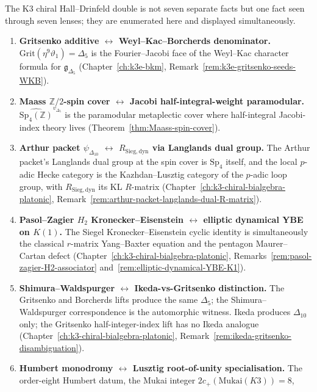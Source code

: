 \begin{remark}
\label{rem:qca-seven-lenses}
The K3 chiral Hall--Drinfeld double is not seven separate facts but one
fact seen through seven lenses; they are enumerated here and displayed
simultaneously.
\begin{enumerate}[label=\textup{(L\arabic*)}]
\item \textbf{Gritsenko additive $\leftrightarrow$ Weyl--Kac--Borcherds denominator.}
 $\mathrm{Grit}(\eta^9\vartheta_1) = \Delta_5$ is the Fourier--Jacobi face of the
 Weyl--Kac character formula for $\mathfrak{g}_{\Delta_5}$
 (Chapter~\ref{ch:k3e-bkm}, Remark~\ref{rem:k3e-gritsenko-seeds-WKB}).
\item \textbf{Maass $\mathbb{Z}/2$-spin cover $\leftrightarrow$ Jacobi half-integral-weight paramodular.}
 $\widehat{\mathrm{Sp}_4(\mathbb{Z})}^{v_{\Delta_5}}$ is the paramodular metaplectic
 cover where half-integral Jacobi-index theory lives
 (Theorem~\ref{thm:Maass-spin-cover}).
\item \textbf{Arthur packet $\psi_{\Delta_{10}}$ $\leftrightarrow$ $R_{\mathrm{Sieg,dyn}}$ via Langlands dual group.}
 The Arthur packet's Langlands dual group at the spin cover is $\mathrm{Sp}_4$ itself,
 and the local $p$-adic Hecke category is the Kazhdan--Lusztig category of the
 $p$-adic loop group, with $R_{\mathrm{Sieg,dyn}}$ its KL $R$-matrix
 (Chapter~\ref{ch:k3-chiral-bialgebra-platonic},
 Remark~\ref{rem:arthur-packet-langlands-dual-R-matrix}).
\item \textbf{Pasol--Zagier $H_2$ Kronecker--Eisenstein $\leftrightarrow$ elliptic dynamical YBE on $K(1)$.}
 The Siegel Kronecker--Eisenstein cyclic identity is simultaneously the classical $r$-matrix
 Yang--Baxter equation and the pentagon Maurer--Cartan defect
 (Chapter~\ref{ch:k3-chiral-bialgebra-platonic},
 Remarks~\ref{rem:pasol-zagier-H2-associator}
 and~\ref{rem:elliptic-dynamical-YBE-K1}).
\item \textbf{Shimura--Waldspurger $\leftrightarrow$ Ikeda-vs-Gritsenko distinction.}
 The Gritsenko and Borcherds lifts produce the same $\Delta_5$; the Shimura--Waldspurger
 correspondence is the automorphic witness. Ikeda produces $\Delta_{10}$ only; the
 Gritsenko half-integer-index lift has no Ikeda analogue
 (Chapter~\ref{ch:k3-chiral-bialgebra-platonic},
 Remark~\ref{rem:ikeda-gritsenko-disambiguation}).
\item \textbf{Humbert monodromy $\leftrightarrow$ Lusztig root-of-unity specialisation.}
 The order-eight Humbert datum, the Mukai integer \(2c_+(\mathrm{Mukai}(K3))=8\),

\end{enumerate}
\end{remark}
